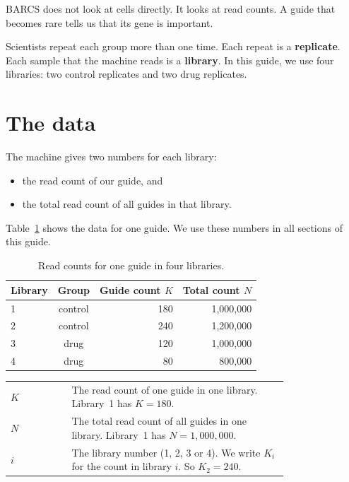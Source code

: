 \documentclass[12pt]{article}
\begin{document}
\begin{remember}
BARCS does not look at cells directly. It looks at read counts. A guide that
becomes rare tells us that its gene is important.
\end{remember}

Scientists repeat each group more than one time. Each repeat is a
\textbf{replicate}. Each sample that the machine reads is a \textbf{library}.
In this guide, we use four libraries: two control replicates and two drug
replicates.

\section{The data}

The machine gives two numbers for each library:

\begin{itemize}
\item the read count of our guide, and
\item the total read count of all guides in that library.
\end{itemize}

Table~\ref{tab:data} shows the data for one guide. We use these numbers in
all sections of this guide.

\begin{table}[h]
\centering
\caption{Read counts for one guide in four libraries.}
\label{tab:data}
\begin{tabular}{lcrr}
\toprule
Library & Group & Guide count $K$ & Total count $N$\\
\midrule
1 & control & 180 & 1{,}000{,}000\\
2 & control & 240 & 1{,}200{,}000\\
3 & drug    & 120 & 1{,}000{,}000\\
4 & drug    &  80 &   800{,}000\\
\bottomrule
\end{tabular}
\end{table}

\begin{symbols}
\begin{tabular}{@{}l p{0.78\linewidth}@{}}
$K$ & The read count of one guide in one library. Library~1 has $K=180$.\\
$N$ & The total read count of all guides in one library. Library~1 has
      $N=1{,}000{,}000$.\\
$i$ & The library number (1, 2, 3 or 4). We write $K_i$ for the count in
      library $i$. So $K_2=240$.\\
\end{tabular}
\end{symbols}
\end{document}

